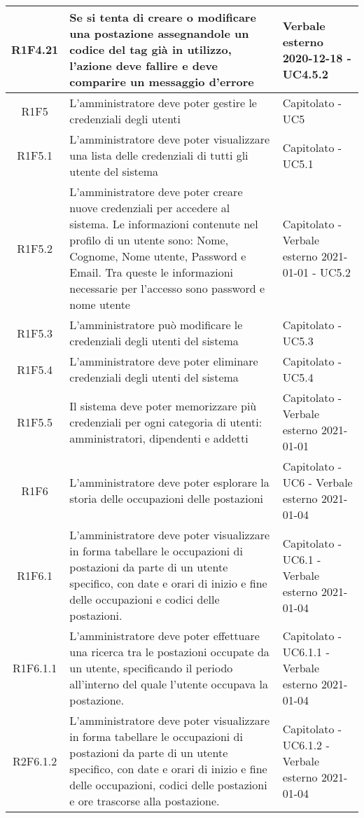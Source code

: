 \begin{center}
\begin{longtable}{|c|p{10cm}|p{4cm}|}
						\hline
			R1F4.21&Se si tenta di creare o modificare una postazione assegnandole un codice del tag già in utilizzo, l'azione deve fallire e deve comparire un messaggio d'errore	&Verbale esterno 2020-12-18 - UC4.5.2 	\\
					\hline
			R1F5&L'amministratore deve poter gestire le credenziali degli utenti	& Capitolato - UC5		\\
					\hline
R1F5.1&L'amministratore deve poter visualizzare una lista delle credenziali di tutti gli utente del sistema	& Capitolato - UC5.1	\\
					\hline
R1F5.2&L'amministratore deve poter creare nuove credenziali per accedere al sistema. Le informazioni contenute nel profilo di un utente sono: Nome, Cognome, Nome utente, Password e Email. Tra queste le informazioni necessarie per l'accesso sono password e nome utente	& Capitolato - Verbale esterno 2021-01-01 - UC5.2	\\
						\hline
			R1F5.3&L'amministratore può modificare le credenziali degli utenti del sistema	&Capitolato - UC5.3 	\\
					\hline
			R1F5.4&L'amministratore deve poter eliminare credenziali degli utenti del sistema	& Capitolato - UC5.4	\\
					\hline
R1F5.5&Il sistema deve poter memorizzare più credenziali per ogni categoria di utenti: amministratori, dipendenti e addetti	& Capitolato - Verbale esterno 2021-01-01	\\
					\hline
R1F6&L'amministratore deve poter esplorare la storia delle occupazioni delle postazioni	& Capitolato - UC6 - Verbale esterno 2021-01-04	\\
						\hline
			R1F6.1&L'amministratore deve poter visualizzare in forma tabellare le occupazioni di postazioni da parte di un utente specifico, con date e orari di inizio e fine delle occupazioni e codici delle postazioni.	&Capitolato - UC6.1 - Verbale esterno 2021-01-04	\\
					\hline
			R1F6.1.1&L'amministratore deve poter effettuare una ricerca tra le postazioni occupate da un utente, specificando il periodo all'interno del quale l'utente occupava la postazione. & 	Capitolato - UC6.1.1 - Verbale esterno 2021-01-04\\
					\hline
			R2F6.1.2&L'amministratore deve poter visualizzare in forma tabellare le occupazioni di postazioni da parte di un utente specifico, con date e orari di inizio e fine delle occupazioni,  codici delle postazioni e ore trascorse alla postazione. & 	Capitolato - UC6.1.2 - Verbale esterno 2021-01-04\\

\end{longtable}
\end{center}
